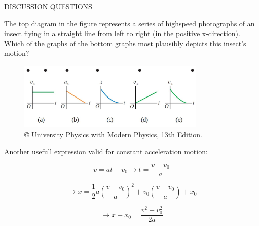 \documentclass[]{beamer}
\begin{document}

\begin{frame}
   DISCUSSION QUESTIONS
   \vspace{3mm}
   
   The top diagram in the figure represents a series of highspeed
photographs of an insect flying in a straight line from left to
right (in the positive x-direction). Which of the graphs of the bottom graphs 
most plausibly depicts this insect’s motion?

      \begin{figure}[h!]   
      \includegraphics[width=0.8\textwidth]{images/21.jpg}
      \caption{ {\tiny © University Physics 
      with Modern Physics, 13th Edition.} }
   \end{figure}
   
    \end{frame}


  \begin{frame}
 Another usefull expression valid for constant acceleration motion:
 
\begin{equation*}
   v=at+v_0 \rightarrow t=\frac{v-v_0}{a}
\end{equation*}
\pause

\begin{equation*}
  \rightarrow x=\frac{1}{2}a(\frac{v-v_0}{a})^2+v_0(\frac{v-v_0}{a})+x_0
\end{equation*}
\pause

\begin{equation*}
   \rightarrow x-x_0=\frac{v^2-v^2_0}{2a}
 \end{equation*}

  \end{frame}
 

\end{document}
